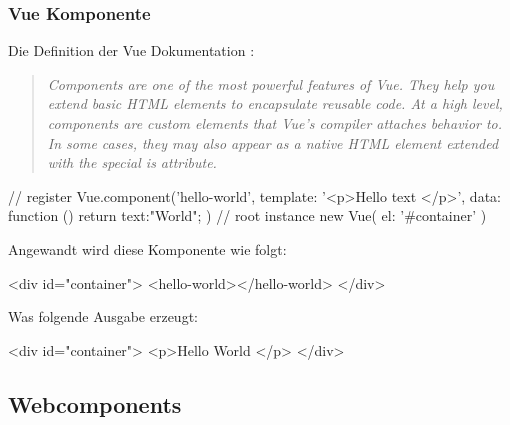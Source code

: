 \subsubsection{Vue Komponente}
Die Definition der Vue Dokumentation \cite{vue-component}: 
\begin{quote}
	\begin{english}
		\textit{Components are one of the most powerful features of Vue. They help you extend basic HTML elements to encapsulate reusable code. At a high level, components are custom elements that Vue’s compiler attaches behavior to. In some cases, they may also appear as a native HTML element extended with the special is attribute.}
	\end{english}
\end{quote}

\begin{JsCode}
// register
Vue.component('hello-world', {
	template: '<p>Hello {{ text }} </p>',
	data: function () {
		return {text:"World"};
	}
})
// root instance
new Vue({
	el: '#container'
})
\end{JsCode}

Angewandt wird diese Komponente wie folgt:
\begin{JsCode}[numbers=none]
<div id="container">
	<hello-world></hello-world>
</div>
\end{JsCode}
Was folgende Ausgabe erzeugt:
\begin{JsCode}[numbers=none]
<div id="container">
	<p>Hello World </p>
</div>
\end{JsCode}

\subsection{Webcomponents }
